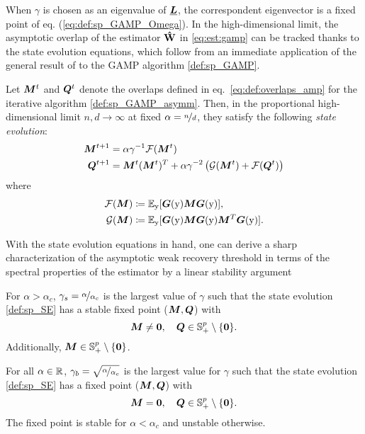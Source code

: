 When $\gamma$ is chosen as an eigenvalue of ${\underline{\bm{L}}}$, the correspondent eigenvector is a fixed point of eq. (\ref{eq:def:sp_GAMP_Omega}). In the high-dimensional limit, the asymptotic overlap of the estimator $\boldsymbol{\mathbf{\hat{W}}}$ in \eqref{eq:est:gamp} can be tracked thanks to the state evolution equations, which follow from an immediate application of the general result of \cite{javanmard2013state} to the GAMP algorithm \eqref{def:sp_GAMP}.
\begin{proposition} 
Let $\bm{M}^{t}$ and $\bm{Q}^{t}$ denote the overlaps defined in eq.~\eqref{eq:def:overlaps_amp} for the iterative algorithm \eqref{def:sp_GAMP_asymm}. Then, in the proportional high-dimensional limit $n,d\to\infty$ at fixed $\alpha = \nicefrac{n}{d}$, they satisfy the following \emph{state evolution}: 
\label{def:sp_SE}
\begin{align}
\bm{M}^{t+1} &= \alpha\gamma^{-1}{\mathcal F}(\bm{M}^t)\\
    \bm{Q}^{t+1} &= \bm{M}^t(\bm{M}^t)^T + \alpha\gamma^{-2}  \left({\mathcal G}(\bm{M}^t) + {\mathcal F}(\bm{Q}^{t}) \right) \label{app:eq:se_sp_gamp_Q}
\end{align}
where
\begin{align}\label{app:eq:def:operator_F}{\mathcal F}(\bm{M}) &\coloneqq \mathbb{E}_{{ \mathrm{y} }}[{\boldsymbol G}({ \mathrm{y} })\bm{M} {\boldsymbol G}({ \mathrm{y} })],\\
{\mathcal G}(\bm{M}) &\coloneqq \mathbb{E}_{{ \mathrm{y} }}[{\boldsymbol G}({ \mathrm{y} })\bm{M} {\boldsymbol G}({ \mathrm{y} })\bm{M}^T {\boldsymbol G}({ \mathrm{y} })].
\end{align}
\end{proposition}
With the state evolution equations in hand, one can derive a sharp characterization of the asymptotic weak recovery threshold in terms of the spectral properties of the estimator by a linear stability argument \cite{strogatz2001nonlinear}
\begin{lemma}
    \label{result:1}
    For $\alpha>\alpha_c$,  $\gamma_s = \nicefrac{\alpha}{\alpha_c}$ is the largest value of $\gamma$ such that the state evolution \ref{def:sp_SE} has a stable fixed point ($\bm{M},\bm{Q}$) with
    \begin{equation}
        \bm{M}\neq{\boldsymbol 0},\quad\bm{Q} \in \mathbb{S}_+^p \setminus \{{\boldsymbol 0}\}.
    \end{equation}
   Additionally, $\bm{M}\in\mathbb{S}_+^p \setminus \{{\boldsymbol 0}\}$.
\end{lemma}
\begin{lemma}
    \label{result:2}
For all $\alpha\in\mathbb{R}$,  $\gamma_b = \sqrt{\nicefrac{\alpha}{\alpha_c}}$ is the largest value for $\gamma$ such that the state evolution \ref{def:sp_SE} has a fixed point ($\bm{M},\bm{Q}$) with
    \begin{equation}
        \bm{M} = {\boldsymbol 0},\quad\bm{Q} \in \mathbb{S}_+^p \setminus \{{\boldsymbol 0}\}.
    \end{equation}
    The fixed point is stable for $\alpha<\alpha_c$ and unstable otherwise.
\end{lemma}
